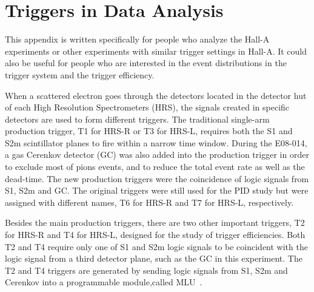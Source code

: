 \chapter{Triggers in Data Analysis}
  This appendix is written specifically for people who analyze the Hall-A experiments or other experiments with similar trigger settings in Hall-A. It could also be useful for people who are interested in the event distributions in the trigger system and the trigger efficiency.
  
  When a scattered electron goes through the detectors located in the detector hut of each High Resolution Spectrometers (HRS), the signals created in specific detectors are used to form different triggers. The traditional single-arm production trigger, T1 for HRS-R or T3 for HRS-L, requires both the S1 and S2m scintillator planes to fire within a narrow time window. During the E08-014, a gas Cerenkov detector (GC) was also added into the production trigger in order to exclude most of pions events, and to reduce the total event rate as well as the dead-time. The new production triggers were the coincidence of logic signals from S1, S2m and GC. The original triggers were still used for the PID study but were assigned with different names, T6 for HRS-R and T7 for HRS-L, respectively. 

 Besides the main production triggers, there are two other important triggers, T2 for HRS-R and T4 for HRS-L, designed for the study of trigger efficiencies. Both T2 and T4 require only one of S1 and S2m logic signals to be coincident with the logic signal from a third detector plane, such as the GC in this experiment. The T2 and T4 triggers are generated by sending logic signals from S1, S2m and Cerenkov into a programmable module,called MLU~\cite{halla_daq}.

